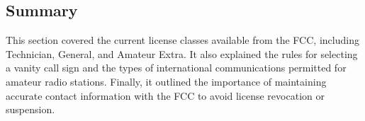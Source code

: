 
\subsection*{Summary}
This section covered the current license classes available from the FCC, including Technician, General, and Amateur Extra. It also explained the rules for selecting a vanity call sign and the types of international communications permitted for amateur radio stations. Finally, it outlined the importance of maintaining accurate contact information with the FCC to avoid license revocation or suspension.

